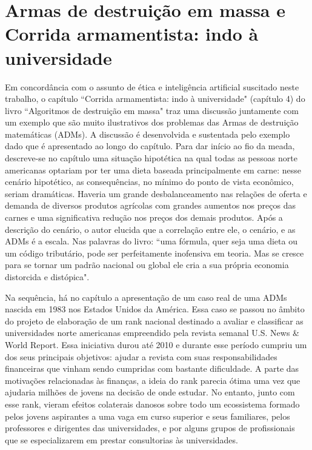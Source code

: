 \documentclass{article}
\begin{document}
\section*{Armas de destruição em massa e Corrida armamentista: indo à universidade}
Em concordância com o assunto de ética e inteligência artificial suscitado neste trabalho, o capítulo ``Corrida armamentista: indo à universidade" (capítulo 4) do livro ``Algoritmos de destruição em massa" \cite{o2021algoritmos} traz uma discussão juntamente com um exemplo que são muito ilustrativos dos problemas das Armas de destruição matemáticas (ADMs). A discussão é desenvolvida e sustentada pelo exemplo dado que é apresentado ao longo do capítulo. Para dar início ao fio da meada, descreve-se no capítulo uma situação hipotética na qual todas as pessoas norte americanas optariam por ter uma dieta baseada principalmente em carne: nesse cenário hipotético, as consequências, no mínimo do ponto de vista econômico, seriam dramáticas. Haveria um grande desbalanceamento nas relações de oferta e demanda de diversos produtos agrícolas com grandes aumentos nos preços das carnes e uma significativa redução nos preços dos demais produtos. Após a descrição do cenário, o autor elucida que a correlação entre ele, o cenário, e as ADMs é a escala. Nas palavras do livro: ``uma fórmula, quer seja uma dieta ou um código tributário, pode ser perfeitamente inofensiva em teoria. Mas se cresce para se tornar um padrão nacional ou global ele cria a sua própria economia distorcida e distópica".

Na sequência, há no capítulo a apresentação de um caso real de uma ADMs nascida em 1983 nos Estados Unidos da América. Essa caso se passou no âmbito do projeto de elaboração de um rank nacional destinado a avaliar e classificar as universidades norte americanas empreendido pela revista semanal U.S. News \& World Report. Essa iniciativa durou até 2010 e durante esse período cumpriu um dos seus principais objetivos: ajudar a revista com suas responsabilidades financeiras que vinham sendo cumpridas com bastante dificuldade. A parte das motivações relacionadas às finanças, a ideia do rank parecia ótima uma vez que ajudaria milhões de jovens na decisão de onde estudar. No entanto, junto com esse rank, vieram efeitos colaterais danosos sobre todo um ecossistema formado pelos jovens aspirantes a uma vaga em curso superior e seus familiares, pelos professores e dirigentes das universidades, e por alguns grupos de profissionais que se especializarem em prestar consultorias às universidades. 
\end{document}
